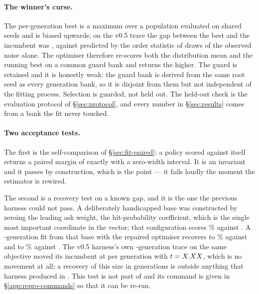 \paragraph{The winner's curse.} The per-generation best is a maximum over a
population evaluated on shared seeds and is biased upwards; on the v0.5 trace the
gap between the best and the incumbent was \vsixFitBestGap{}, against
\vsixFitOrderStat{} predicted by the order statistic of \vsixFitPop{} draws of
the observed noise alone. The optimiser therefore re-scores both the
distribution mean and the running best on a common guard bank and returns the
higher. The guard is retained and it is honestly weak: the guard bank is derived
from the same root seed as every generation bank, so it is disjoint from them but
not independent of the fitting process. Selection is guarded, not held out. The
held-out check is the evaluation protocol of \S\ref{sec:protocol}, and every
number in \S\ref{sec:results} comes from a bank the fit never touched.

\paragraph{Two acceptance tests.} The first is the self-comparison of
\S\ref{sec:fit-paired}: a policy scored against itself returns a paired margin of
exactly \vsixPairedSelfDelta{} with a zero-width interval. It is an invariant and
it passes by construction, which is the point --- it fails loudly the moment the
estimator is rewired.

The second is a recovery test on a known gap, and it is the one the previous
harness could not pass. A deliberately handicapped base was constructed by
zeroing the leading ask weight, the hit-probability coefficient, which is the
single most important coordinate in the vector; that configuration scores
\numFitSanityBase{}\% against \vfive{}. A \numFitSanityGens{}-generation fit from
that base with the repaired optimiser recovers to \numFitSanityAfter{}\% against
\vfive{} and to \numFitSanityVthree{}\% against \vthree{}. The v0.5 harness's own
\numFitTraceGensVfive{}-generation trace on the same objective moved its
incumbent at \vsixFitSlope{} per generation with $t = X.XX{}$, which is
no movement at all; a recovery of this size in \numFitSanityGens{} generations is outside
anything that harness produced in \numFitTraceGensVfive{}. This test is not part of
 and its command is given in
\S\ref{app:repro-commands} so that it can be re-run.

